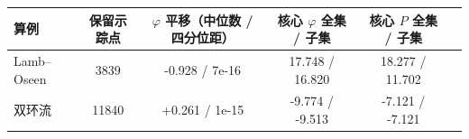 \begin{tabular}{lccccc}\toprule 算例 & 保留示踪点 & $\varphi$ 平移（中位数 / 四分位距） & 核心 $\varphi$ 全集 / 子集 & 核心 $P$ 全集 / 子集\\\midrule
Lamb–Oseen & 3839 & -0.928 / 7e-16 & 17.748 / 16.820 & 18.277 / 11.702\\
双环流 & 11840 & +0.261 / 1e-15 & -9.774 / -9.513 & -7.121 / -7.121\\
\bottomrule\end{tabular}